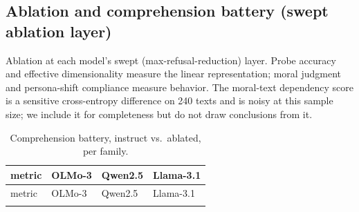 \subsection{Ablation and comprehension battery (swept ablation layer)}\label{a.2-ablation-and-comprehension-battery-swept-ablation-layer}

Ablation at each model's swept (max-refusal-reduction) layer. Probe accuracy and
effective dimensionality measure the linear representation; moral judgment and
persona-shift compliance measure behavior. The moral-text dependency score is a
sensitive cross-entropy difference on 240 texts and is noisy at this sample size;
we include it for completeness but do not draw conclusions from it.

\begin{longtable}[]{@{}
  >{\raggedright\arraybackslash}p{}
  >{\raggedright\arraybackslash}p{}
  >{\raggedright\arraybackslash}p{}
  >{\raggedright\arraybackslash}p{}@{}}
\caption{Comprehension battery, instruct vs.~ablated, per family.
\label{tab:a-battery}}\tabularnewline
\toprule\noalign{}
\begin{minipage}[b]{\linewidth}\raggedright
metric
\end{minipage} & \begin{minipage}[b]{\linewidth}\raggedright
OLMo-3
\end{minipage} & \begin{minipage}[b]{\linewidth}\raggedright
Qwen2.5
\end{minipage} & \begin{minipage}[b]{\linewidth}\raggedright
Llama-3.1
\end{minipage} \\
\midrule\noalign{}
\endfirsthead
\toprule\noalign{}
\begin{minipage}[b]{\linewidth}\raggedright
metric
\end{minipage} & \begin{minipage}[b]{\linewidth}\raggedright
OLMo-3
\end{minipage} & \begin{minipage}[b]{\linewidth}\raggedright
Qwen2.5
\end{minipage} & \begin{minipage}[b]{\linewidth}\raggedright
Llama-3.1
\end{minipage} \\
\midrule\noalign{}

\end{longtable}
